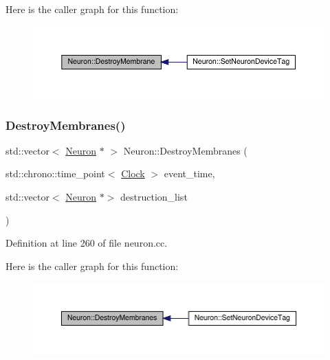 Here is the caller graph for this function\+:
\nopagebreak
\begin{figure}[H]
\begin{center}
\leavevmode
\includegraphics[width=350pt]{class_neuron_a127d1b915e976c63e731a94b7d27e0b1_icgraph}
\end{center}
\end{figure}
\mbox{\label{class_neuron_ab77feff95ed7127400a4e02648641ff7}} 
\subsubsection{\texorpdfstring{Destroy\+Membranes()}{DestroyMembranes()}}
{\footnotesize\ttfamily std\+::vector$<$ \hyperlink{class_neuron}{Neuron} $\ast$ $>$ Neuron\+::\+Destroy\+Membranes (\begin{DoxyParamCaption}\item[{std\+::chrono\+::time\+\_\+point$<$ \hyperlink{universe_8h_a0ef8d951d1ca5ab3cfaf7ab4c7a6fd80}{Clock} $>$}]{event\+\_\+time,  }\item[{std\+::vector$<$ \hyperlink{class_neuron}{Neuron} $\ast$$>$}]{destruction\+\_\+list }\end{DoxyParamCaption})}



Definition at line 260 of file neuron.\+cc.

Here is the caller graph for this function\+:
\nopagebreak
\begin{figure}[H]
\begin{center}
\leavevmode
\includegraphics[width=350pt]{class_neuron_ab77feff95ed7127400a4e02648641ff7_icgraph}
\end{center}
\end{figure}
\mbox{\label{class_neuron_a6ff7510f73e29c31003b016bdcb4a70e}} 
